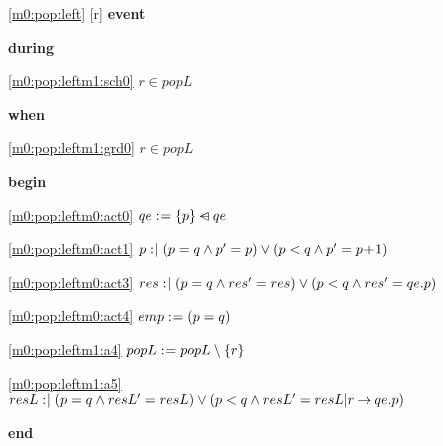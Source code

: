 \noindent \ref{m0:pop:left} [r] \textbf{event}
\begin{block}
  \item   \textbf{during}
  \begin{block}
  \item[ \eqref{m0:pop:leftm1:sch0} ]$r \in popL $ %
  \end{block}
  \item   \textbf{when}
  \begin{block}
  \item[ \eqref{m0:pop:leftm1:grd0} ]$r \in popL $ %
  \end{block}
  \item   \textbf{begin}
  \begin{block}
  \item[ \eqref{m0:pop:leftm0:act0} ]$qe \mathrel{:\mkern1mu=} \{ p \} \mathbin{\lhd\mkern-14mu-} qe $ %
  \item[ \eqref{m0:pop:leftm0:act1} ]$p \mathrel{:\mkern1mu\mid} (p = q \land p' = p) \lor (p < q \land p' = p\! + \!1) $ %
  \item[ \eqref{m0:pop:leftm0:act3} ]$res \mathrel{:\mkern1mu\mid} (p = q \land res' = res) \lor (p < q \land res' = qe.p) $ %
  \item[ \eqref{m0:pop:leftm0:act4} ]$emp \mathrel{:\mkern1mu=} (p = q) $ %
  \item[ \eqref{m0:pop:leftm1:a4} ]$popL \mathrel{:\mkern1mu=} popL \setminus \{ r \} $ %
  \item[ \eqref{m0:pop:leftm1:a5} ]$resL \bcmsuch (p = q \land resL' = resL)  %
  	\lor (p < q \land resL' = resL | r \fun qe.p) $ %
  \end{block}
  \item   \textbf{end} \\
\end{block}
